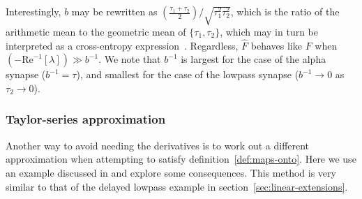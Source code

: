 Interestingly, $b$ may be rewritten as $\left( \frac{ \tau_1 + \tau_2}{2} \right) / \sqrt{\tau_1^2 \tau_2^2}$, which is the ratio of the arithmetic mean to the geometric mean of $\{\tau_1, \tau_2\}$, which may in turn be interpreted as a cross-entropy expression~\citep{woodhouse2001ratio}.
Regardless, $\hat{F}$ behaves like $F$ when $\left(-\text{Re}^{-1} \left[ \lambda \right]\right) \gg b^{-1}$.
We note that $b^{-1}$ is largest for the case of the alpha synapse ($b^{-1} = \tau$), and smallest for the case of the lowpass synapse ($b^{-1} \rightarrow 0$ as $\tau_2 \rightarrow 0$).

\subsubsection{Taylor-series approximation}

Another way to avoid needing the derivatives is to work out a different approximation when attempting to satisfy definition~\ref{def:maps-onto}.
Here we use an example discussed in \citet{dynamicspatent} and explore some consequences.
This method is very similar to that of the delayed lowpass example in section~\ref{sec:linear-extensions}.

